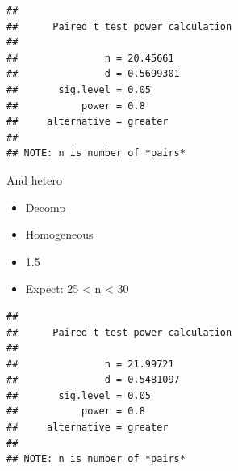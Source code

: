 \documentclass[
]{article}
\newenvironment{Shaded}{\begin{snugshade}}{\end{snugshade}}
\newcommand{\AttributeTok}[1]{\textcolor[rgb]{0.77,0.63,0.00}{#1}}
\newcommand{\DecValTok}[1]{\textcolor[rgb]{0.00,0.00,0.81}{#1}}
\newcommand{\FloatTok}[1]{\textcolor[rgb]{0.00,0.00,0.81}{#1}}
\newcommand{\FunctionTok}[1]{\textcolor[rgb]{0.00,0.00,0.00}{#1}}
\newcommand{\NormalTok}[1]{#1}
\newcommand{\OtherTok}[1]{\textcolor[rgb]{0.56,0.35,0.01}{#1}}
\newcommand{\SpecialCharTok}[1]{\textcolor[rgb]{0.00,0.00,0.00}{#1}}
\newcommand{\StringTok}[1]{\textcolor[rgb]{0.31,0.60,0.02}{#1}}
\begin{document}
\begin{verbatim}
## 
##      Paired t test power calculation 
## 
##               n = 20.45661
##               d = 0.5699301
##       sig.level = 0.05
##           power = 0.8
##     alternative = greater
## 
## NOTE: n is number of *pairs*
\end{verbatim}

And hetero

\begin{itemize}
\item
  Decomp
\item
  Homogeneous
\item
  1.5
\item
  Expect: 25 \textless{} n \textless{} 30
\end{itemize}

\begin{Shaded}
\end{Shaded}

\begin{verbatim}
## 
##      Paired t test power calculation 
## 
##               n = 21.99721
##               d = 0.5481097
##       sig.level = 0.05
##           power = 0.8
##     alternative = greater
## 
## NOTE: n is number of *pairs*
\end{verbatim}
\end{document}
